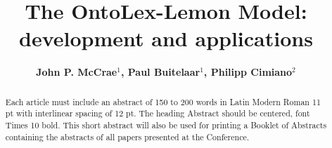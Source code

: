 \documentclass[12pt,a4paper]{elex2017}
\begin{document}
\mainmatter
\title{The OntoLex-Lemon Model: development and applications}
\author{\bf John P. McCrae$^1$, Paul Buitelaar$^1$, Philipp Cimiano$^{2}$}

\maketitle

\begin{abstract}
Each article must include an abstract of 150 to 200 words in Latin Modern Roman
11 pt with interlinear spacing of 12 pt. The heading Abstract should be
centered, font Times 10 bold. This short abstract will also be used for
printing a Booklet of Abstracts containing the abstracts of all papers
    presented at the Conference.

\end{abstract}


\end{document}
